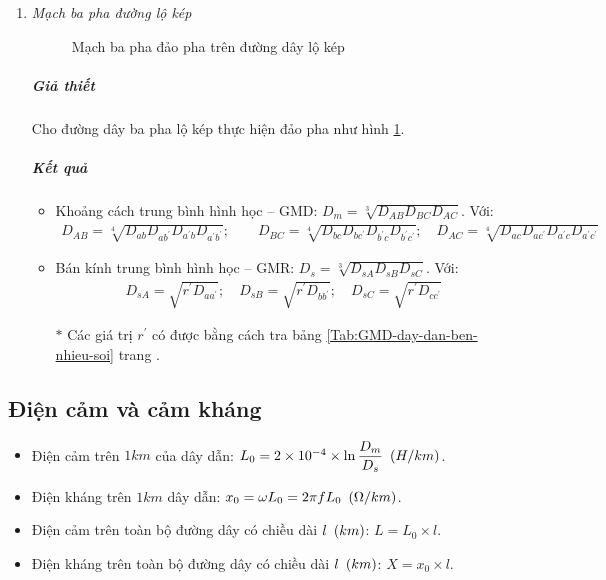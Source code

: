 \begin{enumerate}[\it a.]
\item \textit{Mạch ba pha đường lộ kép}
\begin{figure}[!h]
\begin{center}
\end{center}
\caption{Mạch ba pha đảo pha trên đường dây lộ kép} \label{Fig:mach-ba-duong-day-kep}
\end{figure}
\subparagraph{Giả thiết} Cho đường dây ba pha lộ kép thực hiện đảo pha như hình \ref{Fig:mach-ba-duong-day-kep}.
\subparagraph{Kết quả}
\begin{itemize}
\item Khoảng cách trung bình hình học -- GMD: $D_m = \sqrt[3]{D_{AB}D_{BC}D_{AC}}$. Với:
	\begin{align*}
	 D_{AB} = \sqrt[4]{D_{ab} D_{ab^\prime} D_{a^\prime b} D_{a^\prime b^\prime}}; \qquad D_{BC} = \sqrt[4]{D_{bc} D_{bc^\prime} D_{b^\prime c} D_{b^\prime c^\prime}}; \quad D_{AC} = \sqrt[4]{D_{ac} D_{ac^\prime} D_{a^\prime c} D_{a^\prime c^\prime}}
	\end{align*}
\item Bán kính trung bình hình học -- GMR: $D_s = \sqrt[3]{D_{sA}  D_{sB} D_{sC}}$. Với: 
	\begin{align*}
		D_{sA}  = \sqrt{r^\prime D_{a a^\prime}}; \quad D_{sB}  = \sqrt{r^\prime D_{ b b^\prime}}; \quad D_{sC}  = \sqrt{r^\prime D_{c c^\prime}}
	\end{align*}
	\item[$\ast$] Các giá trị $r^\prime$ có được bằng cách tra bảng \ref{Tab:GMD-day-dan-ben-nhieu-soi} trang \pageref{Tab:GMD-day-dan-ben-nhieu-soi}.
\end{itemize}
\end{enumerate}
\subsection{Điện cảm và cảm kháng}
\begin{itemize}
\item Điện cảm trên $1\unit{km}$ của dây dẫn: $L_0 = 2 \times 10^{-4}\times \ln{\dfrac{D_m}{D_s}} ~\left({H/km}\right)$.
\item Điện kháng trên $1\unit{km}$ dây dẫn: $x_0 = \omega L_0 = 2\pi f L_0 ~\left({\Omega/km}\right)$.
\item Điện cảm trên toàn bộ đường dây có chiều dài  $l ~\left({km}\right)$: $L = L_0 \times l$.
\item Điện kháng trên toàn bộ đường dây có chiều dài  $l ~\left({km}\right)$: $X = x_0 \times l$.
\end{itemize}
